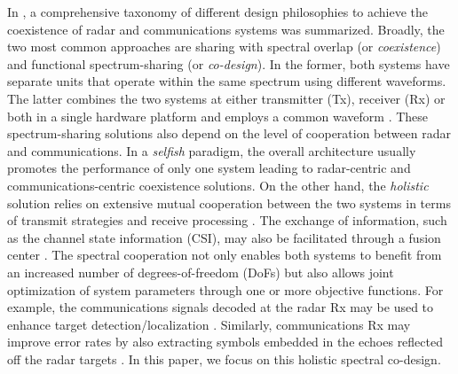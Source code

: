 \documentclass[9pt,journal]{IEEEtran}
\theoremstyle{definition}
\begin{document}
In \cite{d2020uplink}, a comprehensive taxonomy of different design philosophies to achieve the coexistence of radar and communications systems was summarized. Broadly, the two most common approaches are sharing with spectral overlap (or \textit{coexistence}) and functional spectrum-sharing (or \textit{co-design}). In the former, both systems have separate units that operate within the same spectrum using different waveforms. %
The latter combines the two systems at either transmitter (Tx), receiver (Rx) or both in a single hardware platform and employs a common waveform %
\cite{mishra2019toward,liu2018mu,duggal2020doppler}%
. %
These spectrum-sharing solutions also depend on the level of cooperation between radar and communications. In a \textit{selfish} paradigm, the overall architecture usually promotes the performance of only one system leading to radar-centric \cite{alaee2019discrete,bao2019precoding,slavik2019cognitive} and communications-centric \cite{ayyar2019robust} coexistence solutions. %
On the other hand, the \textit{holistic} solution relies on extensive mutual cooperation between the two systems in terms of transmit strategies and receive processing \cite{mahal2017spectral,MCMIMO_RadComm,qian2018joint,rihan2018optimum,Lops2019serveillance,biswas2018fdqos,he2019performance}. The exchange of information, such as the channel state information (CSI), may also be facilitated through a fusion center \cite{MCMIMO_RadComm,he2019performance}.
The spectral cooperation not only enables both systems to benefit from an increased number of degrees-of-freedom (DoFs) but also allows joint optimization of system parameters through one \cite{MCMIMO_RadComm,qian2018joint} or more \cite{biswas2018fdqos,dokhanchi2020multi} objective functions. For example, the communications signals decoded at the radar Rx may be used to enhance target detection/localization \cite{biswas2018fdqos,he2019performance}. Similarly, communications Rx may improve error rates by also extracting symbols embedded in the echoes reflected off the radar targets \cite{liu2018mimo}. In this paper, we focus on this holistic spectral co-design.
\end{document}
